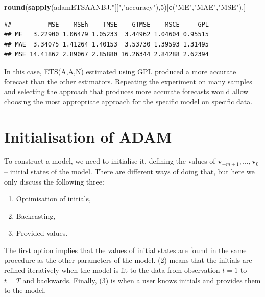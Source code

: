 \documentclass[]{book}
\newenvironment{Shaded}{\begin{snugshade}}{\end{snugshade}}
\newcommand{\DecValTok}[1]{\textcolor[rgb]{0.00,0.00,0.81}{#1}}
\newcommand{\KeywordTok}[1]{\textcolor[rgb]{0.13,0.29,0.53}{\textbf{#1}}}
\newcommand{\NormalTok}[1]{#1}
\newcommand{\StringTok}[1]{\textcolor[rgb]{0.31,0.60,0.02}{#1}}
\providecommand{\tightlist}{%
  \setlength{\itemsep}{0pt}\setlength{\parskip}{0pt}}
\theoremstyle{definition}
\theoremstyle{definition}
\theoremstyle{definition}
\theoremstyle{definition}
\theoremstyle{remark}
\begin{document}
\begin{Shaded}
\begin{Highlighting}[]
\KeywordTok{round}\NormalTok{(}\KeywordTok{sapply}\NormalTok{(adamETSAANBJ,}\StringTok{"[["}\NormalTok{,}\StringTok{"accuracy"}\NormalTok{),}\DecValTok{5}\NormalTok{)[}\KeywordTok{c}\NormalTok{(}\StringTok{"ME"}\NormalTok{,}\StringTok{"MAE"}\NormalTok{,}\StringTok{"MSE"}\NormalTok{),]}
\end{Highlighting}
\end{Shaded}

\begin{verbatim}
##          MSE    MSEh    TMSE    GTMSE    MSCE     GPL
## ME   3.22900 1.06479 1.05233  3.44962 1.04604 0.95515
## MAE  3.34075 1.41264 1.40153  3.53730 1.39593 1.31495
## MSE 14.41862 2.89067 2.85880 16.26344 2.84288 2.62394
\end{verbatim}

In this case, ETS(A,A,N) estimated using GPL produced a more accurate forecast than the other estimators. Repeating the experiment on many samples and selecting the approach that produces more accurate forecasts would allow choosing the most appropriate approach for the specific model on specific data.

\hypertarget{ADAMInitialisation}{%
\section{Initialisation of ADAM}\label{ADAMInitialisation}}

To construct a model, we need to initialise it, defining the values of \(\mathbf{v}_{-m+1}, \dots, \mathbf{v}_0\) -- initial states of the model. There are different ways of doing that, but here we only discuss the following three:

\begin{enumerate}
\def\labelenumi{\arabic{enumi}.}
\tightlist
\item
  Optimisation of initials,
\item
  Backcasting,
\item
  Provided values.
\end{enumerate}

The first option implies that the values of initial states are found in the same procedure as the other parameters of the model. (2) means that the initials are refined iteratively when the model is fit to the data from observation \(t=1\) to \(t=T\) and backwards. Finally, (3) is when a user knows initials and provides them to the model.
\end{document}

